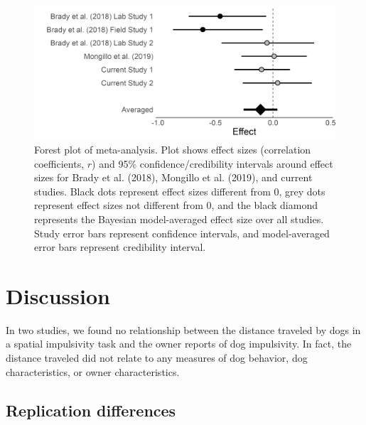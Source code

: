\documentclass[
  pub,floatsintext]{apa6}
\begin{document}
\begin{figure}

{\centering \includegraphics[width=1\linewidth]{figures/forestplot_bf} 

}

\caption{Forest plot of meta-analysis. Plot shows effect sizes (correlation coefficients, $r$) and 95\% confidence/credibility intervals around effect sizes for Brady et al. (2018), Mongillo et al. (2019), and current studies. Black dots represent effect sizes different from 0, grey dots represent effect sizes not different from 0, and the black diamond represents the Bayesian model-averaged effect size over all studies. Study error bars represent confidence intervals, and model-averaged error bars represent credibility interval.}\label{fig:forestplot}
\end{figure}

\hypertarget{discussion}{%
\section{Discussion}\label{discussion}}

In two studies, we found no relationship between the distance traveled by dogs in a spatial impulsivity task and the owner reports of dog impulsivity. In fact, the distance traveled did not relate to any measures of dog behavior, dog characteristics, or owner characteristics.

\hypertarget{replication-differences}{%
\subsection{Replication differences}\label{replication-differences}}
\end{document}
